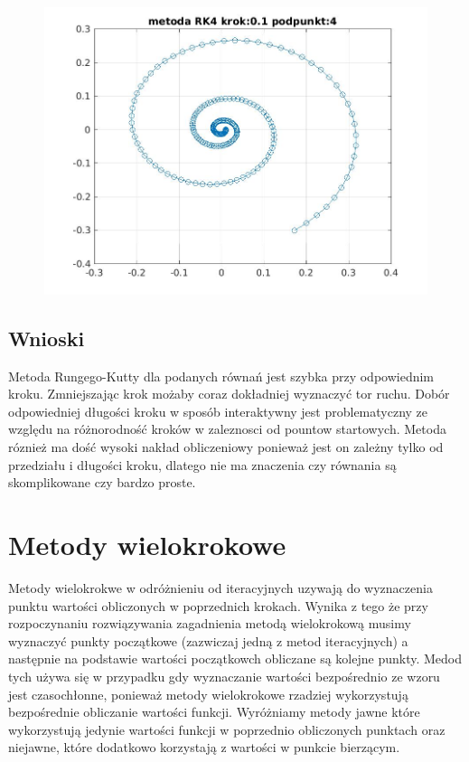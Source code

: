 \documentclass[a4paper, 11pt]{article}
\begin{document}
\begin{figure}[H]
\centering
\includegraphics[width = 15cm]{2d/metoda RK4 krok:0,1 podpunkt:4.jpg}
\end{figure}

\subsection{Wnioski}
Metoda Rungego-Kutty dla podanych równań jest szybka przy odpowiednim kroku. Zmniejszając krok możaby coraz dokładniej wyznaczyć tor ruchu. Dobór odpowiedniej długości kroku w sposób interaktywny jest problematyczny ze względu na różnorodność kroków w zaleznosci od pountow startowych. Metoda róznież ma dość wysoki nakład obliczeniowy ponieważ jest on zależny tylko od przedziału i długości kroku, dlatego nie ma znaczenia czy równania są skomplikowane czy bardzo proste. 

\section{Metody wielokrokowe}
Metody wielokrokwe w odróżnieniu od iteracyjnych uzywają do wyznaczenia punktu wartości obliczonych w poprzednich krokach. Wynika z tego że przy rozpoczynaniu rozwiązywania zagadnienia metodą wielokrokową musimy wyznaczyć punkty początkowe (zazwiczaj jedną z metod iteracyjnych) a następnie na podstawie wartości początkowch obliczane są kolejne punkty. Medod tych używa się w przypadku gdy wyznaczanie wartości bezpośrednio ze wzoru jest czasochłonne, ponieważ metody wielokrokowe rzadziej wykorzystują bezpośrednie obliczanie wartości funkcji. Wyróżniamy metody jawne które wykorzystują jedynie wartości funkcji w poprzednio obliczonych punktach oraz niejawne, które dodatkowo korzystają z wartości w punkcie bierzącym. 
\end{document}
